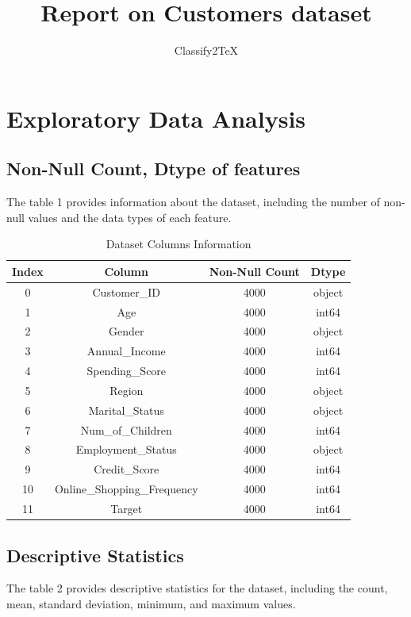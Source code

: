\documentclass{article}%
\title{Report on Customers dataset}%
\author{Classify2TeX}%
\begin{document}
%
\normalsize%
\maketitle%
\newpage%
\tableofcontents%
\newpage%
\section{Exploratory Data Analysis}%
\label{sec:ExploratoryDataAnalysis}%
\subsection{Non{-}Null Count, Dtype of features}%
\label{subsec:Non{-}NullCount,Dtypeoffeatures}%
The table 1 provides information about the dataset, including the number of non-null values and the data types of each feature.%


\begin{table}[h!]%
\caption{Dataset Columns Information}%
\vspace{0.2cm}%
\centering%
\begin{tabular}{|c||c||c||c|}%
\hline%
Index&Column&Non{-}Null Count&Dtype\\%
\hline%
0&Customer\_ID&4000&object\\%
1&Age&4000&int64\\%
2&Gender&4000&object\\%
3&Annual\_Income&4000&int64\\%
4&Spending\_Score&4000&int64\\%
5&Region&4000&object\\%
6&Marital\_Status&4000&object\\%
7&Num\_of\_Children&4000&int64\\%
8&Employment\_Status&4000&object\\%
9&Credit\_Score&4000&int64\\%
10&Online\_Shopping\_Frequency&4000&int64\\%
11&Target&4000&int64\\%
\hline%
\end{tabular}%
\end{table}

%
\newpage%
\subsection{Descriptive Statistics}%
\label{subsec:DescriptiveStatistics}%
The table 2 provides descriptive statistics for the dataset, including the count, mean, standard deviation, minimum, and maximum values.%
\end{document}
